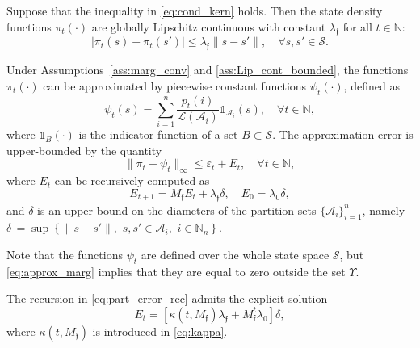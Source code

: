 \documentclass{LMCS}
\begin{document}
\begin{lem}
\label{lmm:lip_cont}
Suppose that the inequality in \eqref{eq:cond_kern} holds. 
Then the state density functions $\pi_t(\cdot)$ are globally Lipschitz continuous with constant $\lambda_{\mathfrak f}$ for all $t\in\mathbb N$: 
\begin{equation*}
|\pi_t(s)-\pi_t(s')|\le \lambda_{\mathfrak f}\|s-s'\|,\quad\forall s,s'\in\mathcal S. 
\end{equation*}
\end{lem}
\begin{thm}
\label{thm:Error}
Under Assumptions~\ref{ass:marg_conv} and \ref{ass:Lip_cont_bounded}, 
the functions $\pi_t(\cdot)$ can be approximated by piecewise constant functions $\psi_t(\cdot)$, defined as
\begin{equation}
\label{eq:approx_marg}
\psi_t(s) = \sum_{i=1}^{n}\frac{p_t(i)}{\mathcal L(\mathcal A_i)}\mathds 1_{\mathcal A_i}(s),\quad \forall t\in\mathbb N,
\end{equation}
where $\mathds 1_{B}(\cdot)$ is the indicator function of a set $B\subset\mathcal S$.
The approximation error is upper-bounded by the quantity
\begin{equation}
\label{eq:error}
\|\pi_t-\psi_t\|_\infty \le\varepsilon_t + E_t,\quad \forall t\in\mathbb N,
\end{equation}
where $E_t$ can be recursively computed as 
\begin{equation}
\label{eq:part_error_rec}
E_{t+1} = M_{\mathfrak f} E_t+\lambda_{\mathfrak f}\delta,\quad E_0 = \lambda_0\delta,
\end{equation}
and $\delta$ is an upper bound on the diameters of the partition sets $\{\mathcal A_i\}_{i=1}^{n}$, namely
$\delta\, = \sup\left\{\|s-s'\|,\,\, s,s'\in\mathcal A_i,\,\, i\in\mathbb N_n\right\}$.
\end{thm}
Note that the functions $\psi_t$ are defined over the whole state space $\mathcal S$, 
but \eqref{eq:approx_marg} implies that they are equal to zero outside the set $\Upsilon$.
\begin{cor}
The recursion in \eqref{eq:part_error_rec} admits the explicit solution 
\begin{equation*}
E_t = \left[\kappa(t,M_{\mathfrak f})\lambda_{\mathfrak f}+M_{\mathfrak f}^t\lambda_0\right]\delta,
\end{equation*}
where $\kappa(t,M_{\mathfrak f})$ is introduced in \eqref{eq:kappa}.  
\end{cor}
\end{document}
